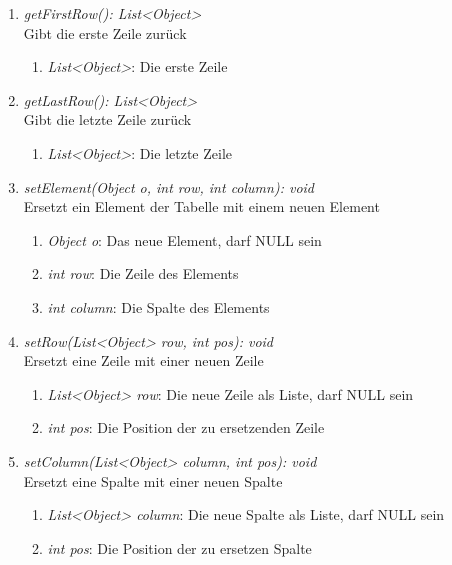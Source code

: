 \begin{enumerate}[+]
	\item \textit{getFirstRow(): List<Object>} \\
	Gibt die erste Zeile zurück
	\vspace{-0.2cm}
	\begin{enumerate}[$\circ$]
		\item \textit{List<Object>}: Die erste Zeile
	\end{enumerate}
	
	\item \textit{getLastRow(): List<Object>} \\
	Gibt die letzte Zeile zurück
	\vspace{-0.2cm}
	\begin{enumerate}[$\circ$]
		\item \textit{List<Object>}: Die letzte Zeile
	\end{enumerate}
	
	\item \textit{setElement(Object o, int row, int column): void} \\
	Ersetzt ein Element der Tabelle mit einem neuen Element
	\begin{enumerate}[$\bullet$]
		\item \textit{Object o}: Das neue Element, darf NULL sein
		\item \textit{int row}: Die Zeile des Elements
		\item \textit{int column}: Die Spalte des Elements
	\end{enumerate}
	\vspace{-0.2cm}
	
	\item \textit{setRow(List<Object> row, int pos): void} \\
	Ersetzt eine Zeile mit einer neuen Zeile
	\begin{enumerate}[$\bullet$]
		\item \textit{List<Object> row}: Die neue Zeile als Liste, darf NULL sein
		\item \textit{int pos}: Die Position der zu ersetzenden Zeile
	\end{enumerate}
	\vspace{-0.2cm}
	
	\item \textit{setColumn(List<Object> column, int pos): void} \\
	Ersetzt eine Spalte mit einer neuen Spalte
	\begin{enumerate}[$\bullet$]
		\item \textit{List<Object> column}: Die neue Spalte als Liste, darf NULL sein
		\item \textit{int pos}: Die Position der zu ersetzen Spalte
	\end{enumerate}
	\vspace{-0.2cm}
	

\end{enumerate}
